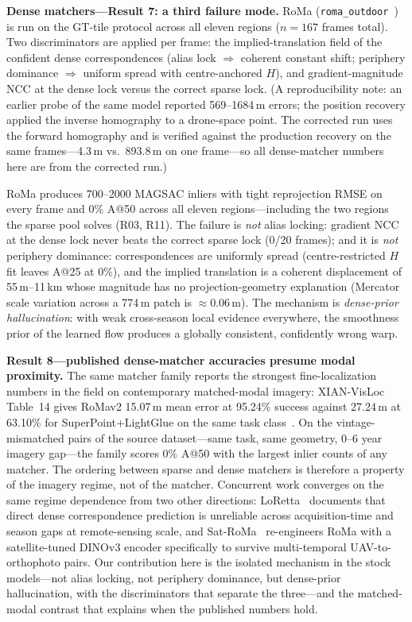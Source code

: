 \documentclass[journal]{IEEEtran}
\begin{document}
\textbf{Dense matchers---Result 7: a third failure mode.} RoMa (\texttt{roma\_outdoor}~\cite{roma}) is run on the GT-tile protocol across all eleven regions ($n=167$ frames total). Two discriminators are applied per frame: the implied-translation field of the confident dense correspondences (alias lock $\Rightarrow$ coherent constant shift; periphery dominance $\Rightarrow$ uniform spread with centre-anchored $H$), and gradient-magnitude NCC at the dense lock versus the correct sparse lock. (A reproducibility note: an earlier probe of the same model reported 569--1684\,m errors; the position recovery applied the inverse homography to a drone-space point. The corrected run uses the forward homography and is verified against the production recovery on the same frames---4.3\,m vs.\ 893.8\,m on one frame---so all dense-matcher numbers here are from the corrected run.)


RoMa produces 700--2000 MAGSAC inliers with tight reprojection RMSE on every frame and 0\% A@50 across all eleven regions---including the two regions the sparse pool solves (R03, R11). The failure is \emph{not} alias locking: gradient NCC at the dense lock never beats the correct sparse lock (0/20 frames); and it is \emph{not} periphery dominance: correspondences are uniformly spread (centre-restricted $H$ fit leaves A@25 at 0\%), and the implied translation is a coherent displacement of 55\,m--11\,km whose magnitude has no projection-geometry explanation (Mercator scale variation across a 774\,m patch is $\approx$0.06\,m). The mechanism is \emph{dense-prior hallucination}: with weak cross-season local evidence everywhere, the smoothness prior of the learned flow produces a globally consistent, confidently wrong warp.

\textbf{Result 8---published dense-matcher accuracies presume modal proximity.} The same matcher family reports the strongest fine-localization numbers in the field on contemporary matched-modal imagery: XIAN-VisLoc Table~14 gives RoMav2 15.07\,m mean error at 95.24\% success against 27.24\,m at 63.10\% for SuperPoint+LightGlue on the same task class~\cite{xianvisloc}. On the vintage-mismatched pairs of the source dataset---same task, same geometry, 0--6 year imagery gap---the family scores 0\% A@50 with the largest inlier counts of any matcher. The ordering between sparse and dense matchers is therefore a property of the imagery regime, not of the matcher. Concurrent work converges on the same regime dependence from two other directions: LoRetta~\cite{loretta} documents that direct dense correspondence prediction is unreliable across acquisition-time and season gaps at remote-sensing scale, and Sat-RoMa~\cite{satroma} re-engineers RoMa with a satellite-tuned DINOv3 encoder specifically to survive multi-temporal UAV-to-orthophoto pairs. Our contribution here is the isolated mechanism in the stock models---not alias locking, not periphery dominance, but dense-prior hallucination, with the discriminators that separate the three---and the matched-modal contrast that explains when the published numbers hold.
\end{document}
